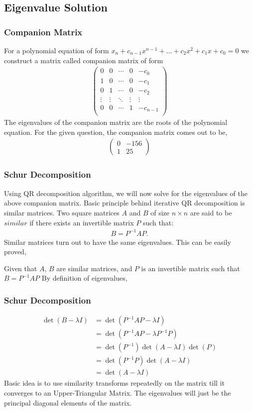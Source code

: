 \documentclass{beamer}
\theoremstyle{remark}
\newcommand{\myvec}[1]{\ensuremath{\begin{pmatrix}#1\end{pmatrix}}}
\numberwithin{equation}{section}
\begin{document}
    \subsection{Eigenvalue Solution}
    \begin{frame}
      \frametitle{Companion Matrix}
      For a polynomial equation of form $x_n+c_{n-1}x^{n-1}+\dots+c_2x^2+c_1x+c_0 = 0$ we construct a matrix called companion matrix of form
      {\small
      \begin{align}
        \myvec{
          0 & 0 & \cdots & 0 & -c_0\\
          1 & 0 & \cdots & 0 & -c_1\\
          0 & 1 & \cdots & 0 & -c_2\\
          \vdots & \vdots & \ddots & \vdots & \vdots\\
          0 & 0 & \cdots & 1 & -c_{n-1}\\
        }
      \end{align}}
      The eigenvalues of the companion matrix are the roots of the polynomial equation.  For the given question, the companion matrix comes out to be,
      {\small
      \begin{align}
        \myvec{0 & -156 \\ 1 & 25}
      \end{align}
      }
    \end{frame}
    \begin{frame}
      \frametitle{Schur Decomposition}
      Using QR decomposition algorithm, we will now solve for the eigenvalues of the above companion matrix. \newline \newline Basic principle behind iterative QR decomposition is similar matrices.
      Two square matrices $A$ and $B$ of size $n \times n$ are said to be $similar$ if there exists an invertible matrix $P$ such that:
      \begin{align}
        B = P^{-1} A P.
      \end{align}
      Similar matrices turn out to have the same eigenvalues. This can be easily proved,

      Given that $A$, $B$ are similar matrices, and $P$ is an invertible matrix such that $B=P^{-1}AP$
      By definition of eigenvalues,
    \end{frame}
    \begin{frame}
      \frametitle{Schur Decomposition}
      {\small
      \begin{align}
        \det(B-\lambda I)&=\det(P^{-1}AP -\lambda I)\\
        &=\det(P^{-1}AP -\lambda P^{-1}P)\\
        &=\det(P^{-1})\det(A-\lambda I)\det(P)\\
        &=\det(P^{-1}P)\det(A- \lambda I)\\
        &=\det(A-\lambda I)
      \end{align}
      }
      Basic idea is to use similarity transforms repeatedly on the matrix till it converges to an Upper-Triangular Matrix. The eigenvalues will just be the principal diagonal elements of the matrix.
    \end{frame}
\end{document}
